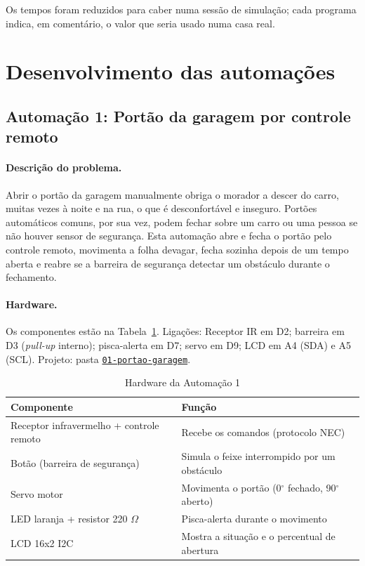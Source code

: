 \documentclass[12pt]{article}
\newcommand{\repositorio}{https://github.com/M-Beserra/Trabalho-sistemas-embarcadosA2}
\newcommand{\pasta}[1]{\href{\repositorio/tree/main/#1}{\texttt{#1}}}
\begin{document}
Os tempos foram reduzidos para caber numa sessão de simulação; cada programa indica, em comentário, o valor que seria usado numa casa real.

\section{Desenvolvimento das automações}\label{sec:desenv}

\subsection{Automação 1: Portão da garagem por controle remoto}\label{sub:a1}

\paragraph{Descrição do problema.} Abrir o portão da garagem manualmente obriga o morador a descer do carro, muitas vezes à noite e na rua, o que é desconfortável e inseguro. Portões automáticos comuns, por sua vez, podem fechar sobre um carro ou uma pessoa se não houver sensor de segurança. Esta automação abre e fecha o portão pelo controle remoto, movimenta a folha devagar, fecha sozinha depois de um tempo aberta e reabre se a barreira de segurança detectar um obstáculo durante o fechamento.

\paragraph{Hardware.} Os componentes estão na Tabela~\ref{tab:hw1}. Ligações: Receptor IR em D2; barreira em D3 (\emph{pull-up} interno); pisca-alerta em D7; servo em D9; LCD em A4 (SDA) e A5 (SCL). Projeto: pasta \pasta{01-portao-garagem}.

\begin{table}[ht]
\centering
\caption{Hardware da Automação 1}\label{tab:hw1}
\footnotesize
\begin{tabularx}{\textwidth}{lX}
\toprule
Componente & Função \\
\midrule
Receptor infravermelho + controle remoto & Recebe os comandos (protocolo NEC) \\
Botão (barreira de segurança) & Simula o feixe interrompido por um obstáculo \\
Servo motor & Movimenta o portão (0$^\circ$ fechado, 90$^\circ$ aberto) \\
LED laranja + resistor 220 $\Omega$ & Pisca-alerta durante o movimento \\
LCD 16x2 I2C & Mostra a situação e o percentual de abertura \\
\bottomrule
\end{tabularx}
\end{table}
\end{document}
